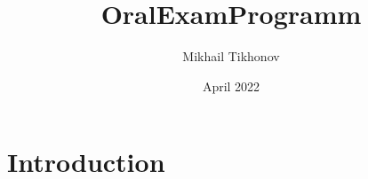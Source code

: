 \documentclass{article}
\title{OralExamProgramm}
\author{Mikhail Tikhonov}
\date{April 2022}
\begin{document}
\maketitle

\section{Introduction}
\end{document}
